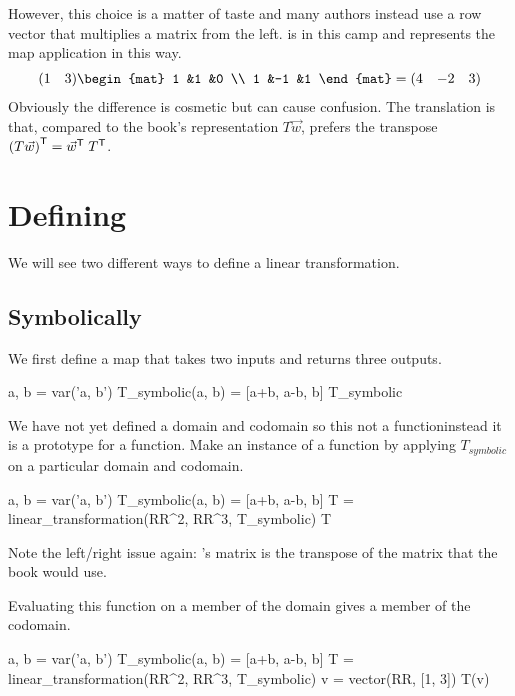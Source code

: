 However, this choice is a matter of taste and many authors instead
use a row vector that multiplies a matrix from the left.
\Sage{} is in this camp and
represents the map application in this way.
\begin{equation*}
  \rowvec{1 &3}
  \begin{mat}
    1 &1  &0 \\
    1 &-1 &1
  \end{mat}
  =
  \rowvec{4 &-2 &3}
\end{equation*}
Obviously the difference is cosmetic but can cause confusion.
The translation is that, compared to the book's representation $T\vec{w}$,
\Sage{} prefers the transpose
${{(T\vec{w})}^{\textsf{T}}}={{\vec{w}}^{\textsf{T}}}\;{{T}^{\textsf{T}}}$.



  

\section{Defining}
We will see two different ways to define a linear transformation.

\subsection{Symbolically}
We first define a map that takes two inputs and returns three outputs.
\begin{sageoutput}
a, b = var('a, b')   
T_symbolic(a, b) = [a+b, a-b, b]         
T_symbolic       
\end{sageoutput}
We have not yet defined a domain and codomain 
so this not a function\Dash instead it is a prototype for a function.
Make an instance of a function by applying $T_{\textit{symbolic}}$ on a 
particular domain and codomain.
\begin{sageoutput}[d,0,2;s,7,68,62;s,8,70,62]
a, b = var('a, b')   
T_symbolic(a, b) = [a+b, a-b, b]         
T = linear_transformation(RR^2, RR^3, T_symbolic)
T                                              
\end{sageoutput}
\noindent Note the left/right issue again: \Sage's matrix is the transpose of
the matrix that the book would use.

Evaluating this function on a member of the domain gives a member
of the codomain. 
\begin{sageoutput}[d,0,3]
a, b = var('a, b')   
T_symbolic(a, b) = [a+b, a-b, b]         
T = linear_transformation(RR^2, RR^3, T_symbolic)
v = vector(RR, [1, 3])  
T(v)
\end{sageoutput}

